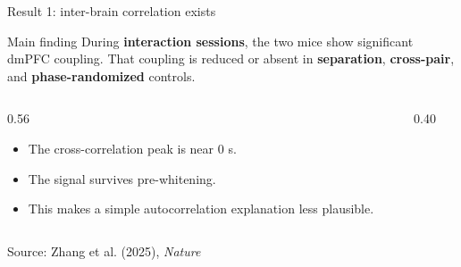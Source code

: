 \documentclass[aspectratio=169,11pt]{beamer}
\newcommand{\papersource}{\vspace{0.25em}\hfill{\scriptsize Source: Zhang et al. (2025), \textit{Nature}}}
\begin{document}
\begin{frame}{Result 1: inter-brain correlation exists}
\begin{block}{Main finding}
During \textbf{interaction sessions}, the two mice show significant dmPFC coupling. That coupling is reduced or absent in \textbf{separation}, \textbf{cross-pair}, and \textbf{phase-randomized} controls.
\end{block}
\vspace{0.5em}
\begin{columns}[T]
  \begin{column}{0.56\textwidth}
    \begin{itemize}
      \item The cross-correlation peak is near 0 s.
      \item The signal survives pre-whitening.
      \item This makes a simple autocorrelation explanation less plausible.
    \end{itemize}
  \end{column}
  \begin{column}{0.40\textwidth}
    \begin{center}
    \end{center}
  \end{column}
\end{columns}
\papersource
\end{frame}
\end{document}
